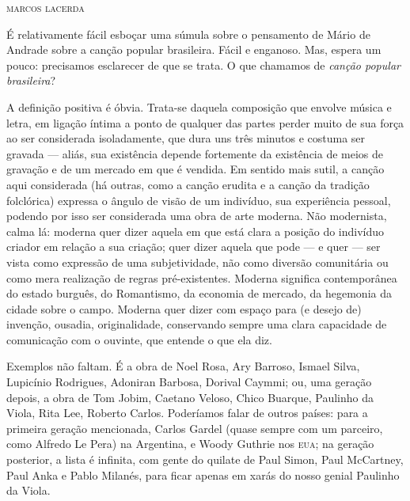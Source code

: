 
\begin{flushright}
\textsc{marcos lacerda}
\end{flushright}

\noindent{}É relativamente fácil esboçar uma súmula sobre o pensamento de Mário de
Andrade sobre a canção popular brasileira. Fácil e enganoso. Mas, espera um pouco: precisamos esclarecer de que se trata. O que chamamos de \textit{canção popular brasileira}?

A definição positiva é óbvia. Trata-se daquela composição que envolve
música e letra, em ligação íntima a ponto de qualquer das partes perder
muito de sua força ao ser considerada isoladamente, que dura uns três
minutos e costuma ser gravada --- aliás, sua existência depende
fortemente da existência de meios de gravação e de um mercado em que é
vendida. Em sentido mais sutil, a canção aqui considerada (há outras,
como a canção erudita e a canção da tradição folclórica) expressa o
ângulo de visão de um indivíduo, sua experiência pessoal, podendo por
isso ser considerada uma obra de arte moderna. Não modernista, calma
lá: moderna quer dizer aquela em que está clara a posição do indivíduo
criador em relação a sua criação; quer dizer aquela que pode --- e quer ---
ser vista como expressão de uma subjetividade, não como diversão
comunitária ou como mera realização de regras pré-existentes. Moderna
significa contemporânea do estado burguês, do Romantismo, da economia de
mercado, da hegemonia da cidade sobre o campo. Moderna quer dizer com
espaço para (e desejo de) invenção, ousadia, originalidade, conservando
sempre uma clara capacidade de comunicação com o ouvinte, que entende o
que ela diz.

Exemplos não faltam. É a obra de Noel Rosa, Ary Barroso, Ismael Silva,
Lupicínio Rodrigues, Adoniran Barbosa, Dorival Caymmi; ou, uma geração
depois, a obra de Tom Jobim, Caetano Veloso, Chico Buarque, Paulinho da
Viola, Rita Lee, Roberto Carlos. Poderíamos falar de outros países: para
a primeira geração mencionada, Carlos Gardel (quase sempre com um
parceiro, como Alfredo Le Pera) na Argentina, e Woody Guthrie nos \textsc{eua};
na geração posterior, a lista é infinita, com gente do quilate de Paul
Simon, Paul McCartney, Paul Anka e Pablo Milanés, para ficar apenas em
xarás do nosso genial Paulinho da Viola. 

